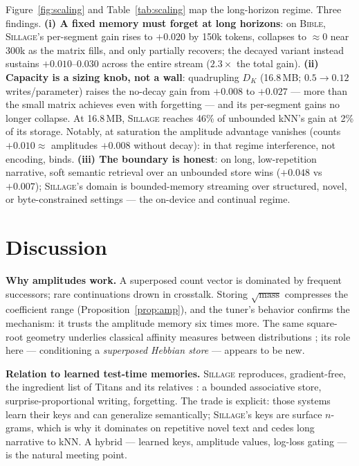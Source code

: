 \documentclass[11pt]{article}
\newcommand{\sillage}{\textsc{Sillage}}
\begin{document}
Figure~\ref{fig:scaling} and Table~\ref{tab:scaling} map the long-horizon regime. Three findings. \textbf{(i) A fixed memory must forget at long horizons}: on \textsc{Bible}, \sillage's per-segment gain rises to $+0.020$ by 150k tokens, collapses to $\approx 0$ near 300k as the matrix fills, and only partially recovers; the decayed variant instead sustains $+0.010$--$0.030$ across the entire stream ($2.3\times$ the total gain). \textbf{(ii) Capacity is a sizing knob, not a wall}: quadrupling $D_K$ (16.8\,MB; $0.5 \to 0.12$ writes/parameter) raises the no-decay gain from $+0.008$ to $+0.027$ --- more than the small matrix achieves even with forgetting --- and its per-segment gains no longer collapse. At 16.8\,MB, \sillage{} reaches 46\% of unbounded kNN's gain at 2\% of its storage. Notably, at saturation the amplitude advantage vanishes (counts $+0.010 \approx$ amplitudes $+0.008$ without decay): in that regime interference, not encoding, binds. \textbf{(iii) The boundary is honest}: on long, low-repetition narrative, soft semantic retrieval over an unbounded store wins ($+0.048$ vs $+0.007$); \sillage's domain is bounded-memory streaming over structured, novel, or byte-constrained settings --- the on-device and continual regime.

\section{Discussion}

\textbf{Why amplitudes work.} A superposed count vector is dominated by frequent successors; rare continuations drown in crosstalk. Storing $\sqrt{\text{mass}}$ compresses the coefficient range (Proposition~\ref{prop:amp}), and the tuner's behavior confirms the mechanism: it trusts the amplitude memory six times more. The same square-root geometry underlies classical affinity measures between distributions \cite{bhatta43,jebara,rootsift}; its role here --- conditioning a \emph{superposed Hebbian store} --- appears to be new.

\textbf{Relation to learned test-time memories.} \sillage{} reproduces, gradient-free, the ingredient list of Titans and its relatives \cite{titans,ttt,ttr}: a bounded associative store, surprise-proportional writing, forgetting. The trade is explicit: those systems learn their keys and can generalize semantically; \sillage's keys are surface $n$-grams, which is why it dominates on repetitive novel text and cedes long narrative to kNN. A hybrid --- learned keys, amplitude values, log-loss gating --- is the natural meeting point.
\end{document}
